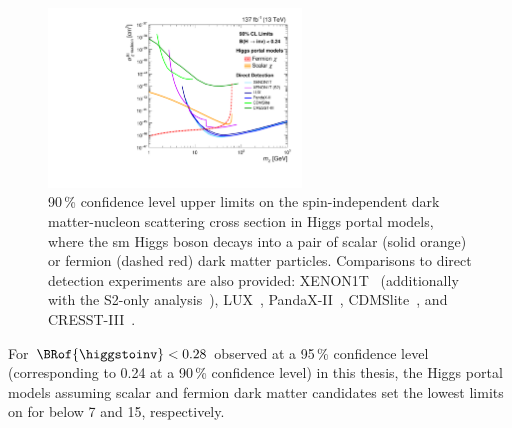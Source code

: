 \begin{figure}
    \centering
    \includegraphics[width=0.6\textwidth]{figures/dark_matter_limit/higgsPortalDM.pdf}
    \caption[90\,\% confidence level upper limits on the spin-independent dark matter-nucleon scattering cross section in Higgs portal models, where the standard model Higgs boson decays into a pair of scalar (solid orange) or fermion (dashed red) dark matter particles]{90\,\% confidence level upper limits on the spin-independent dark matter-nucleon scattering cross section in Higgs portal models, where the \acrlong{sm} Higgs boson decays into a pair of scalar (solid orange) or fermion (dashed red) dark matter particles. Comparisons to direct detection experiments are also provided: XENON1T~\cite{Aprile:2018dbl} (additionally with the S2-only analysis~\cite{Aprile:2019xxb}), LUX~\cite{Akerib:2016vxi}, PandaX-II~\cite{Cui:2017nnn}, CDMSlite~\cite{Agnese:2018gze}, and CRESST-III~\cite{Abdelhameed:2019hmk}.}
    \label{fig:higgs_portal_dm_limits}
\end{figure}

For $\BRof{\higgstoinv} < \text{0.28}$ observed at a 95\,\% confidence level (corresponding to 0.24 at a 90\,\% confidence level) in this thesis, the Higgs portal models assuming scalar and fermion dark matter candidates set the lowest limits on \xsecSI for \mqdark below 7 and 15\GeV, respectively.
